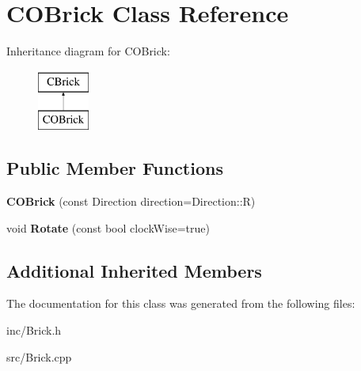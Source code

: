 \hypertarget{classCOBrick}{\section{C\-O\-Brick Class Reference}
\label{classCOBrick}
}
Inheritance diagram for C\-O\-Brick\-:\begin{figure}[H]
\begin{center}
\leavevmode
\includegraphics[height=2.000000cm]{classCOBrick}
\end{center}
\end{figure}
\subsection*{Public Member Functions}
\begin{DoxyCompactItemize}
\item 
\hypertarget{classCOBrick_ac6a97c2b05399ff04e8995c95eec5c0a}{{\bfseries C\-O\-Brick} (const Direction direction=Direction\-::\-R)}\label{classCOBrick_ac6a97c2b05399ff04e8995c95eec5c0a}

\item 
\hypertarget{classCOBrick_aa60947c3aa51e5fbb89965302153001e}{void {\bfseries Rotate} (const bool clock\-Wise=true)}\label{classCOBrick_aa60947c3aa51e5fbb89965302153001e}

\end{DoxyCompactItemize}
\subsection*{Additional Inherited Members}


The documentation for this class was generated from the following files\-:\begin{DoxyCompactItemize}
\item 
inc/Brick.\-h\item 
src/Brick.\-cpp\end{DoxyCompactItemize}

